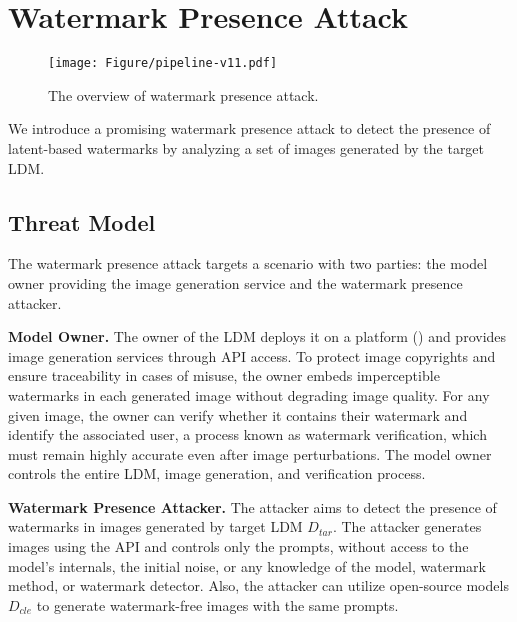 \section{Watermark Presence Attack}
\label{sec:watermark_detection_attack}

\begin{figure}[t]
    \centering
    \texttt{[image: Figure/pipeline-v11.pdf]}
    \vspace{-0.6cm}
    \caption{The overview of watermark presence attack.}
    \label{fig:pipeline}
    \vspace{-0.6cm}
\end{figure}

We introduce a promising watermark presence attack to 
detect the presence of latent-based watermarks by analyzing a set of images generated by the target LDM.

\subsection{Threat Model}
\label{sec:threat_model}
The watermark presence attack targets a scenario with two parties: the model owner providing the image generation service and the watermark presence attacker.

\noindent
\textbf{Model Owner.}
The owner of the LDM deploys it on a platform (\eg \cite{huggingface, civitai, tensorart}) and provides image generation services through API access. To protect image copyrights and ensure traceability in cases of misuse, the owner embeds imperceptible watermarks in each generated image without degrading image quality. For any given image, the owner can verify whether it contains their watermark and identify the associated user, a process known as watermark verification, which must remain highly accurate even after image perturbations.
The model owner controls the entire LDM, image generation, and verification process. 

\noindent
\textbf{Watermark Presence Attacker.}
The attacker aims to detect the presence of watermarks in images generated by target LDM \(D_{tar}\). The attacker generates images using the API and controls only the prompts, without access to the model's internals, the initial noise, or any knowledge of the model, watermark method, or watermark detector. 
Also, the attacker can utilize open-source models \(D_{cle}\) to generate watermark-free images with the same prompts. 

